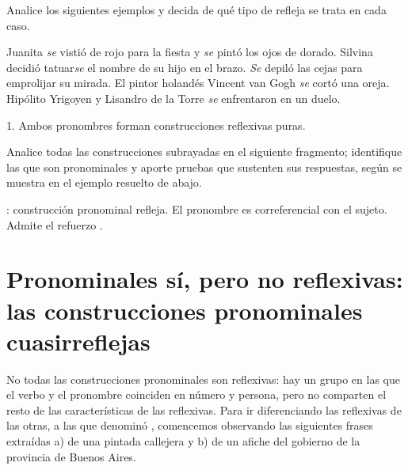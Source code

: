 \begin{ejercicio}\label{ej:10-tiporefleja}
Analice los siguientes ejemplos y decida de qué tipo de refleja se trata en cada
caso.

\begin{exe}
  \ex Juanita \textit{se} vistió de rojo para la fiesta y \textit{se} pintó los
      ojos de dorado.
  \ex Silvina decidió tatuar\textit{se} el nombre de su hijo en el brazo.
  \ex \textit{Se} depiló las cejas para emprolijar su mirada.
  \ex El pintor holandés Vincent van Gogh \textit{se} cortó una oreja.
  \ex Hipólito Yrigoyen y Lisandro de la Torre \textit{se} enfrentaron en un
      duelo.
\end{exe}

\begin{resuelto}
1. Ambos pronombres  forman construcciones reflexivas puras.
\end{resuelto}
\end{ejercicio}

\begin{ejercicio}\label{ej:10-danna}
Analice todas las construcciones subrayadas en el siguiente fragmento;
identifique las que son pronominales y aporte pruebas que sustenten sus
respuestas, según se muestra en el ejemplo resuelto de abajo.


\begin{resuelto}
: construcción pronominal refleja. El pronombre 
es correferencial con el sujeto. Admite el refuerzo .
\end{resuelto}
\end{ejercicio}

\section{Pronominales sí, pero no reflexivas: las construcciones pronominales cuasirreflejas}\label{sec:10-cuasirreflejas}

No todas las construcciones pronominales son reflexivas: hay un grupo en las que
el verbo y el pronombre coinciden en número y persona, pero no comparten el resto
de las características de las reflexivas. Para ir diferenciando las reflexivas
de las otras, a las que \textcite{bello2002} denominó ,
comencemos observando las siguientes frases extraídas a) de una pintada callejera
y b) de un afiche del gobierno de la provincia de Buenos Aires.

